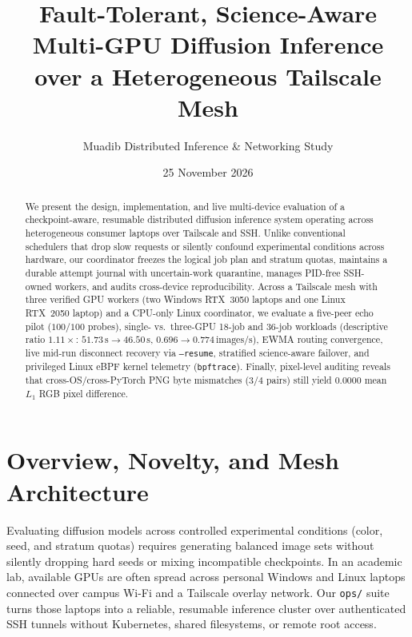 \documentclass[11pt,a4paper]{article}
\title{\textbf{Fault-Tolerant, Science-Aware Multi-GPU Diffusion Inference over a Heterogeneous Tailscale Mesh}}
\author{Muadib Distributed Inference \& Networking Study}
\date{25 November 2026}
\begin{document}
\maketitle

\begin{abstract}
We present the design, implementation, and live multi-device evaluation of a checkpoint-aware, resumable distributed diffusion inference system operating across heterogeneous consumer laptops over Tailscale and SSH. Unlike conventional schedulers that drop slow requests or silently confound experimental conditions across hardware, our coordinator freezes the logical job plan and stratum quotas, maintains a durable attempt journal with uncertain-work quarantine, manages PID-free SSH-owned workers, and audits cross-device reproducibility. Across a Tailscale mesh with three verified GPU workers (two Windows RTX~3050 laptops and one Linux RTX~2050 laptop) and a CPU-only Linux coordinator, we evaluate a five-peer echo pilot ($100/100$ probes), single- vs.\ three-GPU 18-job and 36-job workloads (descriptive ratio $1.11\times$: $51.73\,\text{s} \to 46.50\,\text{s}$, $0.696 \to 0.774\,\text{images/s}$), EWMA routing convergence, live mid-run disconnect recovery via \texttt{--resume}, stratified science-aware failover, and privileged Linux eBPF kernel telemetry (\texttt{bpftrace}). Finally, pixel-level auditing reveals that cross-OS/cross-PyTorch PNG byte mismatches ($3/4$ pairs) still yield $0.0000$ mean $L_1$ RGB pixel difference.
\end{abstract}

\section{Overview, Novelty, and Mesh Architecture}
Evaluating diffusion models across controlled experimental conditions (color, seed, and stratum quotas) requires generating balanced image sets without silently dropping hard seeds or mixing incompatible checkpoints. In an academic lab, available GPUs are often spread across personal Windows and Linux laptops connected over campus Wi-Fi and a Tailscale overlay network. Our \texttt{ops/} suite turns those laptops into a reliable, resumable inference cluster over authenticated SSH tunnels without Kubernetes, shared filesystems, or remote root access.
\end{document}

